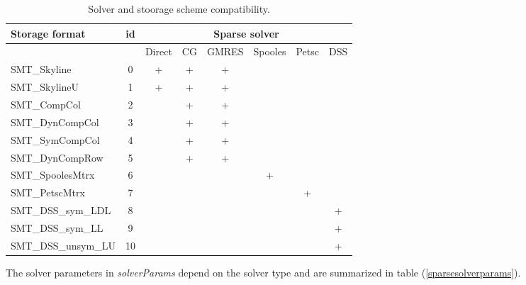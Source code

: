 \documentclass[draft]{article}
\newcommand{\param}[1]{{\em #1}}
\begin{document}
\begin{table}[h]                                                                
\begin{center}
\begin{tabular}{|l|c|c|c|c|c|c|c|}                                                      
\hline                                                                          
Storage format & id & \multicolumn{6}{c|}{Sparse solver} \\
\hline
 && \tiny{Direct} &\tiny{CG} &\tiny{GMRES}
 &\tiny{Spooles}& \tiny{Petsc}& \tiny{DSS}\\
\hline
\small{SMT\_Skyline} &0& + &+&+&&&\\
\small{SMT\_SkylineU} &1& + &+&+&&&\\
\small{SMT\_CompCol} &2& & +&+&&&\\
\small{SMT\_DynCompCol} &3& &+&+&&&\\
\small{SMT\_SymCompCol} &4& &+&+&&&\\
\small{SMT\_DynCompRow} &5&&+&+&&&\\
\small{SMT\_SpoolesMtrx}&6&&&&+&&\\
\small{SMT\_PetscMtrx }&7&&&&&+&\\
\small{SMT\_DSS\_sym\_LDL}&8&&&&&&+\\
\small{SMT\_DSS\_sym\_LL}&9&&&&&&+\\
\small{SMT\_DSS\_unsym\_LU}&10&&&&&&+\\
\hline
\end{tabular}   
\caption{Solver and stoorage scheme compatibility.}                
\label{linsolvstoragecompattable}                                                         
\end{center}                                                                    
\end{table}                                                                     

The solver parameters in \param{solverParams} depend on the solver
type and are summarized in table (\ref{sparsesolverparams}).
\end{document}
